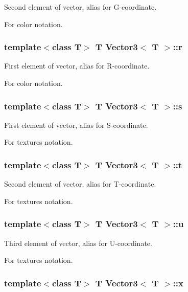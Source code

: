 Second element of vector, alias for G-\/coordinate. 

For color notation. \hypertarget{class_vector3_add6ab48cc3cc8636e4f043caa8824dff}{
\subsubsection[{r}]{\setlength{\rightskip}{0pt plus 5cm}template$<$class T$>$ T {\bf Vector3}$<$ T $>$::{\bf r}}}
\label{class_vector3_add6ab48cc3cc8636e4f043caa8824dff}


First element of vector, alias for R-\/coordinate. 

For color notation. \hypertarget{class_vector3_a152ee26cfc844e014925dc4bb31d10b0}{
\subsubsection[{s}]{\setlength{\rightskip}{0pt plus 5cm}template$<$class T$>$ T {\bf Vector3}$<$ T $>$::{\bf s}}}
\label{class_vector3_a152ee26cfc844e014925dc4bb31d10b0}


First element of vector, alias for S-\/coordinate. 

For textures notation. \hypertarget{class_vector3_a4543c81991a56da65f37a0bba1695c32}{
\subsubsection[{t}]{\setlength{\rightskip}{0pt plus 5cm}template$<$class T$>$ T {\bf Vector3}$<$ T $>$::{\bf t}}}
\label{class_vector3_a4543c81991a56da65f37a0bba1695c32}


Second element of vector, alias for T-\/coordinate. 

For textures notation. \hypertarget{class_vector3_aca1ce49fc91888da09306f222ff43756}{
\subsubsection[{u}]{\setlength{\rightskip}{0pt plus 5cm}template$<$class T$>$ T {\bf Vector3}$<$ T $>$::{\bf u}}}
\label{class_vector3_aca1ce49fc91888da09306f222ff43756}


Third element of vector, alias for U-\/coordinate. 

For textures notation. \hypertarget{class_vector3_a1a0f7e168c71ca798099f0ba8a444244}{
\subsubsection[{x}]{\setlength{\rightskip}{0pt plus 5cm}template$<$class T$>$ T {\bf Vector3}$<$ T $>$::{\bf x}}}
\label{class_vector3_a1a0f7e168c71ca798099f0ba8a444244}


